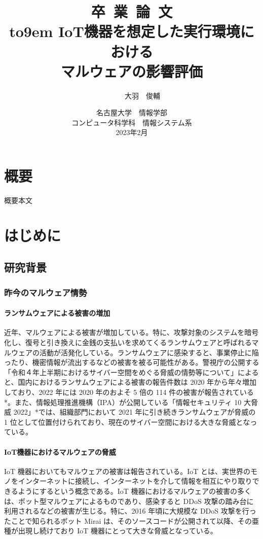 \documentclass[12pt,a4paper,titlepage,report]{jsbook}
\title{%
\vspace*{-6.0em}\sffamily\huge {\Huge 卒~業~論~文}\\[2.0em]{\vbox to9em{%
IoT機器を想定した実行環境における\\マルウェアの影響評価}}} %
\author{\LARGE\sffamily101910020~~~~~~大羽~~俊輔}%
\date{%
\LARGE\vspace{1.0em}\sffamily 名古屋大学~~情報学部\\コンピュータ科学科~~情報システム系\\%
2023年2月}%
\begin{document}
\newpage
\maketitle
\chapter*{{\normalsize 概要}\vspace*{-3\Cvs}}
概要本文


\tableofcontents
\listoffigures
\listoftables
\newpage


\pagestyle{plain}
\chapter{はじめに}
\section{研究背景}
\subsection{昨今のマルウェア情勢}
\subsubsection{ランサムウェアによる被害の増加}
近年、マルウェアによる被害が増加している。特に、攻撃対象のシステムを暗号化し、復号と引き換えに金銭の支払いを求めてくるランサムウェアと呼ばれるマルウェアの活動が活発化している。ランサムウェアに感染すると、事業停止に陥ったり、機密情報が流出するなどの被害を被る可能性がある。警視庁の公開する「令和４年上半期におけるサイバー空間をめぐる脅威の情勢等について」によると、国内におけるランサムウェアによる被害の報告件数は 2020 年から年々増加しており、2022 年には 2020 年のおよそ 5 倍の 114 件の被害が報告されている*。また、情報処理推進機構（IPA）が公開している「情報セキュリティ 10 大脅威 2022」*では、組織部門において 2021 年に引き続きランサムウェアが脅威の 1 位として位置付けられており、現在のサイバー空間における大きな脅威となっている。
\subsubsection{IoT機器におけるマルウェアの脅威}
IoT 機器においてもマルウェアの被害は報告されている。IoT とは、実世界のモノをインターネットに接続し、インターネットを介して情報を相互にやり取りできるようにするという概念である。IoT 機器におけるマルウェアの被害の多くは、ボット型マルウェアによるものであり、感染すると DDoS 攻撃の踏み台に利用されるなどの被害が生じる。特に、2016 年頃に大規模な DDoS 攻撃を行ったことで知られるボット Mirai は、そのソースコードが公開されて以降、その亜種が出現し続けており IoT 機器にとって大きな脅威となっている。  
\end{document}
